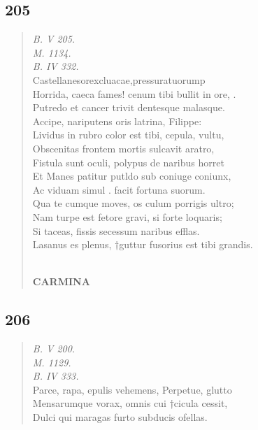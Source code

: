 \documentclass[11pt, a4paper]{report}
\begin{document}
            \subsection*{205}
      \begin{verse}
      \textit{B. V 205.} \\ \textit{M. 1134.} \\ \textit{B. IV 332.} \\ Castellanesorexcluacae,pressuratuorump \\ Horrida, caeca fames! cenum tibi bullit in ore, . \\ Putredo et cancer trivit dentesque malasque. \\ Accipe, nariputens oris latrina, Filippe: \\ Lividus in rubro color est tibi, cepula, vultu, \\ Obscenitas frontem mortis sulcavit aratro, \\ Fistula sunt oculi, polypus de naribus horret \\ Et Manes patitur putldo sub coniuge coniunx, \\ Ac viduam simul . facit fortuna suorum. \\ Qua te cumque moves, os culum porrigis ultro; \\ Nam turpe est fetore gravi, si forte loquaris; \\ Si taceas, fissis secessum naribus efflas. \\ Lasanus es plenus, †guttur fusorius est tibi grandis. \\ 
        ﻿\pagebreak 
     \marginpar{[178]} \begin{center} \textbf{CARMINA} \end{center}
      \end{verse}
  
            \subsection*{206}
      \begin{verse}
      \textit{B. V 200.} \\ \textit{M. 1129.} \\ \textit{B. IV 333.} \\ Parce, rapa, epulis vehemens, Perpetue, glutto \\ Mensarumque vorax, omnis cui †cicula cessit, \\ Dulci qui maragas furto subducis ofellas. \\ 
      \end{verse}
  
\end{document}

